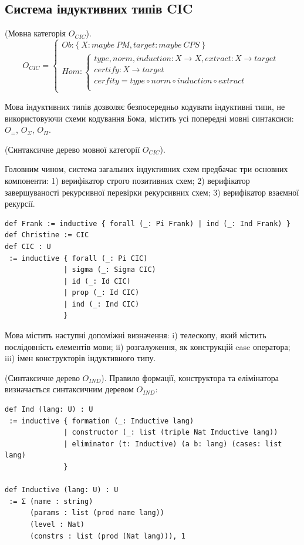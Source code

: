 \newpage
\subsection{Система індуктивних типів CIC}

\begin{definition} (Мовна категорія $O_{CIC}$).
\begin{equation}
O_{CIC} =
\begin{cases}
Ob: \{\ X: maybe\ PM, target: maybe\ CPS\ \} \\
Hom: \begin{cases}
type,norm,induction: X \rightarrow X, extract: X \rightarrow target \\
certify : X \rightarrow target \\
cerfity = type \circ norm \circ induction \circ extract \\
\end{cases}
\end{cases}
\end{equation}
\end{definition}

Мова індуктивних типів дозволяє безпосередньо кодувати індуктивні типи,
не використовуючи схеми кодування Бома, містить усі попередні мовні синтаксиси:
$O_=$, $O_\Sigma$, $O_\Pi$.

\begin{definition} (Синтаксичне дерево мовної категорії $O_{CIC}$).

Головним чином, система загальних індуктивних схем предбачає три основних компоненти:
1) верифікатор строго позитивних схем;
2) верифікатор завершуваності рекурсивної перевірки рекурсивних схем;
3) верифікатор взаємної рекурсії.

\begin{lstlisting}
def Frank := inductive { forall (_: Pi Frank) | ind (_: Ind Frank) }
def Christine := CIC
def CIC : U
 := inductive { forall (_: Pi CIC)
              | sigma (_: Sigma CIC)
              | id (_: Id CIC)
              | prop (_: Id CIC)
              | ind (_: Ind CIC)
              }
\end{lstlisting}
\end{definition}

Мова містить наступні допоміжні визначення: i) телескопу,
який містить послідовність елементів мови; ii) розгалуження,
як конструкцій case оператора; iii) імен конструкторів індуктивного типу.

\begin{definition} (Синтаксичне дерево $O_{IND}$).
Правило формації, конструктора та елімінатора визначається синтаксичним деревом $O_{IND}$:
\begin{lstlisting}
def Ind (lang: U) : U
 := inductive { formation (_: Inductive lang)
              | constructor (_: list (triple Nat Inductive lang))
              | eliminator (t: Inductive) (a b: lang) (cases: list lang)
              }

def Inductive (lang: U) : U
 := Σ (name : string)
      (params : list (prod name lang))
      (level : Nat)
      (constrs : list (prod (Nat lang))), 1
\end{lstlisting}
\end{definition}

